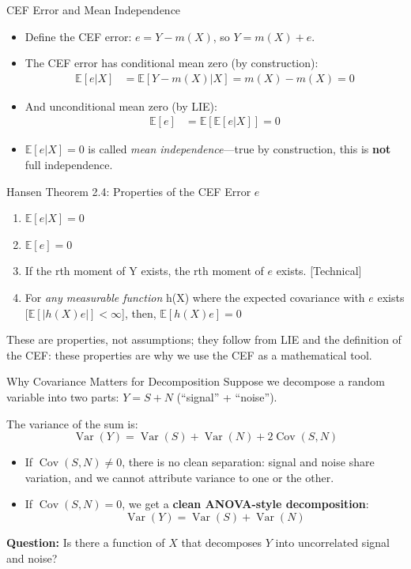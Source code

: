 \documentclass[aspectratio=169]{beamer}
\numberwithin{equation}{section}
\begin{document}
\begin{frame}{CEF Error and Mean Independence}
\begin{itemize}
\item Define the CEF error: $e=Y-m(X)$, so $Y=m(X)+e$.
\item The CEF error has conditional mean zero (by construction):
\begin{align*}
\mathbb{E}[e|X]&=\mathbb{E}[Y-m(X)|X]=m(X)-m(X)=0
\end{align*}
\item And unconditional mean zero (by LIE):
\begin{align*}
\mathbb{E}[e]&=\mathbb{E}[\mathbb{E}[e|X]]=0
\end{align*}
\item $\mathbb{E}[e|X]=0$ is called \emph{mean independence}---true by construction, this is \textbf{not} full independence.
\end{itemize}
\end{frame}


\begin{frame}{Hansen Theorem 2.4: Properties of the CEF Error $e$}
\begin{enumerate}
\item $\mathbb{E}[e|X]=0$
\item $\mathbb{E}[e]=0$
\item If the rth moment of Y exists, the rth moment of $e$ exists. [Technical]
\item For \emph{any measurable function} h(X) where the expected covariance with $e$ exists [$\mathbb{E}[|h(X)e|]< \infty$], then, $\mathbb{E}[h(X)e]=0$
\end{enumerate}
\bigskip

\begin{tcolorbox}[colback=blue!5, colframe=blue!50, title=Key Point]
These are properties, not assumptions; they follow from LIE and the definition of the CEF: \alert{these properties are why we use the CEF as a mathematical tool.}
\end{tcolorbox}
\end{frame}



\begin{frame}{Why Covariance Matters for Decomposition}
Suppose we decompose a random variable into two parts: $Y = S + N$ (``signal'' + ``noise'').
\pause
\medskip

The variance of the sum is:
$$\operatorname{Var}(Y)=\operatorname{Var}(S)+\operatorname{Var}(N)+2\operatorname{Cov}(S,N)$$
\pause
\begin{itemize}
\item If $\operatorname{Cov}(S,N)\neq 0$, there is no clean separation: signal and noise share variation, and we cannot attribute variance to one or the other.
\pause
\item If $\operatorname{Cov}(S,N)= 0$, we get a \textbf{clean ANOVA-style decomposition}:
$$\operatorname{Var}(Y)=\operatorname{Var}(S)+\operatorname{Var}(N)$$
\end{itemize}
\pause
\medskip
\textbf{Question:} Is there a function of $X$ that decomposes $Y$ into uncorrelated signal and noise?
\end{frame}
\end{document}
